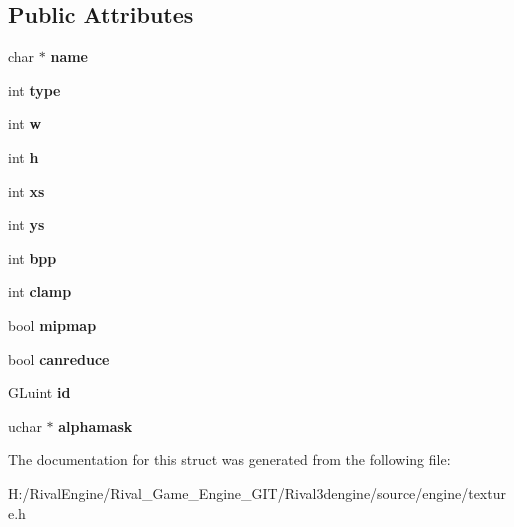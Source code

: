 \subsection*{Public Attributes}
\begin{DoxyCompactItemize}
\item 
\mbox{\label{struct_texture_ada984a9eb960a6f2a8ce2650d37191da}} 
char $\ast$ {\bfseries name}
\item 
\mbox{\label{struct_texture_a862ebc25823906db4f75efb0d95d5bb5}} 
int {\bfseries type}
\item 
\mbox{\label{struct_texture_ac764b8d287887788a925f4b507f3bea0}} 
int {\bfseries w}
\item 
\mbox{\label{struct_texture_a4f783d1307d1ed6ed42da3b1ecb655f8}} 
int {\bfseries h}
\item 
\mbox{\label{struct_texture_a958c8fe2052cd446b77b3b10007d8665}} 
int {\bfseries xs}
\item 
\mbox{\label{struct_texture_afb4d1a69089abdcc33f96ad26eac005e}} 
int {\bfseries ys}
\item 
\mbox{\label{struct_texture_ab63c8cf24933bb90d0ceecbeca891c6f}} 
int {\bfseries bpp}
\item 
\mbox{\label{struct_texture_a5a930b24171d2143a62a150c3c063233}} 
int {\bfseries clamp}
\item 
\mbox{\label{struct_texture_ae44ff2473a5e40382b3af00ab49380e4}} 
bool {\bfseries mipmap}
\item 
\mbox{\label{struct_texture_a019060e4c36021f1903b528131f5aa05}} 
bool {\bfseries canreduce}
\item 
\mbox{\label{struct_texture_af848138d72c1fc995ab414a71ab10d47}} 
G\+Luint {\bfseries id}
\item 
\mbox{\label{struct_texture_a78daf1de56e39ae31170b1c654f8df7d}} 
uchar $\ast$ {\bfseries alphamask}
\end{DoxyCompactItemize}


The documentation for this struct was generated from the following file\+:\begin{DoxyCompactItemize}
\item 
H\+:/\+Rival\+Engine/\+Rival\+\_\+\+Game\+\_\+\+Engine\+\_\+\+G\+I\+T/\+Rival3dengine/source/engine/texture.\+h\end{DoxyCompactItemize}
